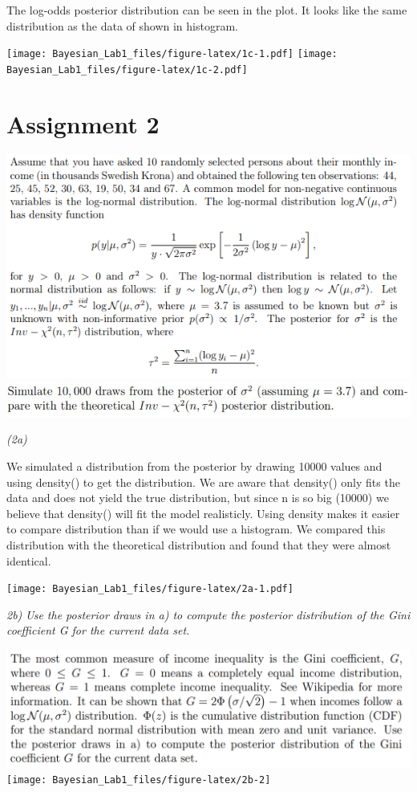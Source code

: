 \documentclass[]{article}
\begin{document}
The log-odds posterior distribution can be seen in the plot. It looks
like the same distribution as the data of shown in histogram.

\texttt{[image: Bayesian\_Lab1\_files/figure-latex/1c-1.pdf]}
\texttt{[image: Bayesian\_Lab1\_files/figure-latex/1c-2.pdf]}

\hypertarget{assignment-2}{%
\section{Assignment 2}\label{assignment-2}}

\includegraphics[width=0.6\linewidth]{Capture}
\includegraphics[width=0.6\linewidth]{2a}

\emph{(2a)}

We simulated a distribution from the posterior by drawing 10000 values
and using density() to get the distribution. We are aware that density()
only fits the data and does not yield the true distribution, but since n
is so big (10000) we believe that density() will fit the model
realisticly. Using density makes it easier to compare distribution than
if we would use a histogram. We compared this distribution with the
theoretical distribution and found that they were almost identical.

\texttt{[image: Bayesian\_Lab1\_files/figure-latex/2a-1.pdf]}

\emph{2b)} \emph{Use the posterior draws in a) to compute the posterior
distribution of the Gini coefficient G for the current data set.}

\includegraphics[width=0.6\linewidth]{2b}
\texttt{[image: Bayesian\_Lab1\_files/figure-latex/2b-2]}
\end{document}
